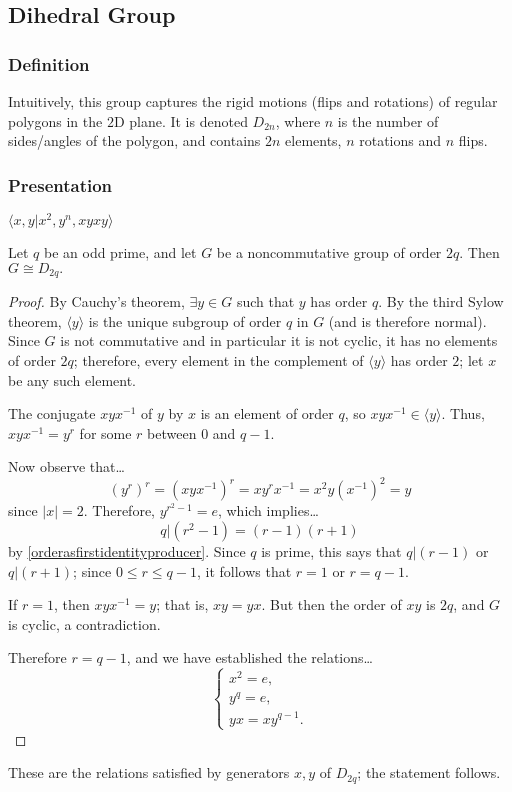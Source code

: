 \subsection{Dihedral Group}\label{dihedralgroup}

\subsubsection{Definition}

Intuitively, this group captures the rigid motions (flips and rotations) of regular polygons in the $2$D plane. It is denoted
$D_{2n}$, where $n$ is the number of sides/angles of the polygon, and contains $2n$ elements, $n$ rotations and $n$ flips.

\subsubsection{Presentation}

$\langle x,y | x^2, y^n, xyxy \rangle$

\begin{proposition}
Let $q$ be an odd prime, and let $G$ be a noncommutative group of order $2q$. Then $G \cong D_{2q}.$
\end{proposition}

\begin{proof}
By Cauchy's theorem, $\exists y \in G$ such that $y$ has order $q$. By the third Sylow theorem, $\langle y \rangle$ is the unique subgroup of order $q$ in $G$ (and is therefore normal).
Since $G$ is not commutative and in particular it is not cyclic, it has no elements of order $2q$; therefore, every element in the complement of $\langle y \rangle$ has order $2$; let $x$
be any such element.

The conjugate $xyx^{-1}$ of $y$ by $x$ is an element of order $q$, so $xyx^{-1} \in \langle y \rangle$. Thus, $xyx^{-1} = y^r$ for some $r$ between $0$ and $q - 1$.

Now observe that\dots
$$(y^r)^r = (xyx^{-1})^r = xy^rx^{-1} = x^2 y (x^{-1})^2 = y$$
since $|x| = 2$. Therefore, $y^{r^2 - 1} = e$, which implies\dots
$$q | (r^2 - 1) = (r-1)(r+1)$$
by \ref{orderasfirstidentityproducer}. Since $q$ is prime, this says that $q | (r-1)$ or $q | (r+1)$; since $0 \leq r \leq q - 1$, it follows that $r = 1$ or $r = q - 1$.

If $r = 1$, then $xyx^{-1} = y$; that is, $xy = yx$. But then the order of $xy$ is $2q$, and $G$ is cyclic, a contradiction.

Therefore $r = q - 1$, and we have established the relations\dots
\[
	\begin{cases}
	x^2 = e, \\
	y^q = e, \\
	yx = xy^{q-1}.
	\end{cases}
\]
\end{proof}
These are the relations satisfied by generators $x,y$ of $D_{2q}$; the statement follows.